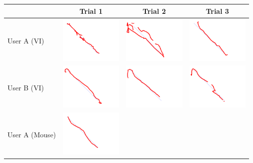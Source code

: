 \begin{tabular}{lccc}
\toprule
 & Trial 1 & Trial 2 & Trial 3\\
\midrule
 User A (VI)&
\includegraphics[width=3cm]{fig_exp/line_Ayaka_test3_0.png} &
\includegraphics[width=3cm]{fig_exp/line_Ayaka_test3_1.png} &
\includegraphics[width=3cm]{fig_exp/line_Ayaka_test3_2.png} \\
\midrule
 User B (VI)&
\includegraphics[width=3cm]{fig_exp/line_Angus_test3_0.png} &
\includegraphics[width=3cm]{fig_exp/line_Angus_test3_1.png} &
\includegraphics[width=3cm]{fig_exp/line_Angus_test3_2.png} \\
\midrule
 User A (Mouse)&
\includegraphics[width=3cm]{fig_exp/line_Ayaka_test3_0_m.png} &

\end{tabular}
